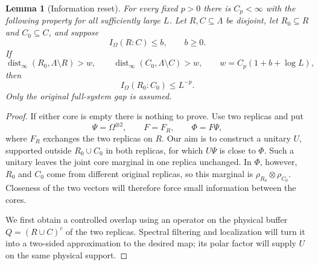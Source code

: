 \documentclass[11pt]{article}
\numberwithin{equation}{section}
\newtheorem{lemma}[theorem]{Lemma}
\theoremstyle{definition}
\theoremstyle{remark}
\begin{document}
\begin{lemma}[Information reset]
\label{lem:reset}
For every fixed $p>0$ there is $C_p<\infty$ with the following
property for all sufficiently large $L$.  Let $R,C\subseteq\Lambda$
be disjoint, let $R_0\subseteq R$ and $C_0\subseteq C$, and suppose
\[
 I_\Omega(R:C)\le b,\qquad b\ge0.
\]
If
\begin{equation}
 \operatorname{dist}_\infty(R_0,\Lambda\setminus R)>w,\qquad
 \operatorname{dist}_\infty(C_0,\Lambda\setminus C)>w,
 \qquad w=C_p(1+b+\log L),
 \label{eq:info-reset-width}
\end{equation}
then
\[
 I_\Omega(R_0:C_0)\le L^{-p}.
\]
Only the original full-system gap is assumed.
\end{lemma}

\begin{proof}
If either core is empty there is nothing to prove.  Use two replicas
and put
\[
 \Psi=\Omega^{\otimes2},\qquad F=F_R,\qquad \Phi=F\Psi,
\]
where $F_R$ exchanges the two replicas on $R$.  Our aim is to construct
a unitary $U$, supported outside $R_0\cup C_0$ in both replicas, for
which $U\Psi$ is close to $\Phi$.  Such a unitary leaves the joint core marginal in one replica
unchanged.  In $\Phi$, however, $R_0$ and $C_0$ come from different
original replicas, so this marginal is $\rho_{R_0}\otimes\rho_{C_0}$.
Closeness of the two vectors will therefore force small information
between the cores.

We first obtain a controlled overlap using an operator on the physical
buffer $Q=(R\cup C)^c$ of the two replicas.  Spectral filtering and
localization will turn it into a two-sided approximation to the desired
map; its polar factor will supply $U$ on the same physical support.


\end{proof}
\end{document}
